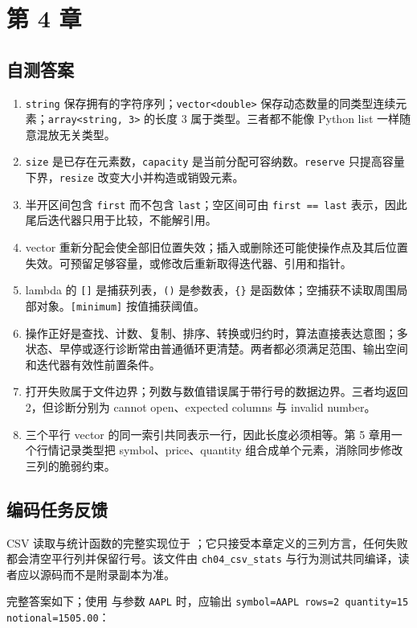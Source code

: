\section{第 4 章}
\subsection*{自测答案}
\begin{enumerate}
  \item \texttt{string} 保存拥有的字符序列；\texttt{vector<double>} 保存动态数量的同类型连续元素；\texttt{array<string, 3>} 的长度 3 属于类型。三者都不能像 Python list 一样随意混放无关类型。
  \item \texttt{size} 是已存在元素数，\texttt{capacity} 是当前分配可容纳数。\texttt{reserve} 只提高容量下界，\texttt{resize} 改变大小并构造或销毁元素。
  \item 半开区间包含 \texttt{first} 而不包含 \texttt{last}；空区间可由 \texttt{first == last} 表示，因此尾后迭代器只用于比较，不能解引用。
  \item vector 重新分配会使全部旧位置失效；插入或删除还可能使操作点及其后位置失效。可预留足够容量，或修改后重新取得迭代器、引用和指针。
  \item lambda 的 \texttt{[]} 是捕获列表，\texttt{()} 是参数表，\texttt{\{\}} 是函数体；空捕获不读取周围局部对象。\texttt{[minimum]} 按值捕获阈值。
  \item 操作正好是查找、计数、复制、排序、转换或归约时，算法直接表达意图；多状态、早停或逐行诊断常由普通循环更清楚。两者都必须满足范围、输出空间和迭代器有效性前置条件。
  \item 打开失败属于文件边界；列数与数值错误属于带行号的数据边界。三者均返回 2，但诊断分别为 cannot open、expected columns 与 invalid number。
  \item 三个平行 vector 的同一索引共同表示一行，因此长度必须相等。第 5 章用一个行情记录类型把 symbol、price、quantity 组合成单个元素，消除同步修改三列的脆弱约束。
\end{enumerate}

\subsection*{编码任务反馈}
CSV 读取与统计函数的完整实现位于 ；它只接受本章定义的三列方言，任何失败都会清空平行列并保留行号。该文件由 \texttt{ch04\_csv\_stats} 与行为测试共同编译，读者应以源码而不是附录副本为准。

完整答案如下；使用  与参数 \texttt{AAPL} 时，应输出 \texttt{symbol=AAPL rows=2 quantity=15 notional=1505.00}：


